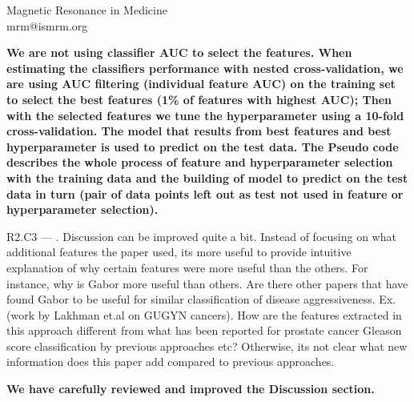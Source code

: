 \documentclass{letter}
\newenvironment{comment}[1]%
  {\vspace{5ex}\par\textsf{#1 ---} \ignorespaces}%
  {\par\ignorespacesafterend}
\newenvironment{reply}%
  {\vspace{2ex}\par\bfseries}%
  {\par\upshape}
\begin{document}
\begin{letter}{Magnetic Resonance in Medicine \\ mrm@ismrm.org}
\begin{reply}
We are not using classifier AUC to select the features. When estimating the
classifiers performance with nested cross-validation, we are using AUC filtering
(individual feature AUC) on the training set to select the best features (1\% of
features with highest AUC); Then with the selected features we tune the
hyperparameter using a 10-fold cross-validation. The model that results from
best features and best hyperparameter is used to predict on the test data. The
Pseudo code describes the whole process of feature and hyperparameter selection
with the training data and the building of model to predict on the test data in
turn (pair of data points left out as test not used in feature or hyperparameter
selection).
\end{reply}


\begin{comment}{R2.C3}
3. Discussion can be improved quite a bit. Instead of focusing on what
additional features the paper used, its more useful to provide intuitive
explanation of why certain features were more useful than the others. For
instance, why is Gabor more useful than others. Are there other papers that have
found Gabor to be useful for similar classification of disease aggressiveness.
Ex. (work by Lakhman et.al on GUGYN cancers). How are the features extracted in
this approach different from what has been reported for prostate cancer Gleason
score classification by previous approaches etc? Otherwise, its not clear what
new information does this paper add compared to previous approaches.
\end{comment}

\begin{reply}
We have carefully reviewed and improved the Discussion section.
\end{reply}



%
%
%
%
%
%



\end{letter}
\end{document}
